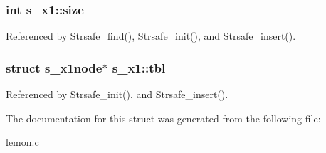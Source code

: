 \hypertarget{structs__x1_ae410b4957e3cad477a2d307481fa1293}{
\subsubsection[{size}]{\setlength{\rightskip}{0pt plus 5cm}int s\-\_\-x1\-::size}}\label{structs__x1_ae410b4957e3cad477a2d307481fa1293}


Referenced by Strsafe\-\_\-find(), Strsafe\-\_\-init(), and Strsafe\-\_\-insert().

\hypertarget{structs__x1_a292e56fd839ec5f7b9a61efe74a543f0}{
\subsubsection[{tbl}]{\setlength{\rightskip}{0pt plus 5cm}struct {\bf s\-\_\-x1node}$\ast$ s\-\_\-x1\-::tbl}}\label{structs__x1_a292e56fd839ec5f7b9a61efe74a543f0}


Referenced by Strsafe\-\_\-init(), and Strsafe\-\_\-insert().



The documentation for this struct was generated from the following file\-:\begin{DoxyCompactItemize}
\item 
\hyperlink{lemon_8c}{lemon.\-c}\end{DoxyCompactItemize}
